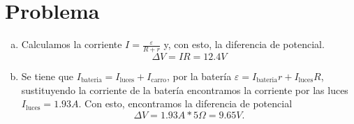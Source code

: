 \section*{Problema}

\begin{enumerate}[a)]
	\item Calculamos la corriente $I = \frac{\varepsilon}{R + r}$ y, con esto, la diferencia de potencial.
		$$ \boxed{ \Delta V = IR = 12.4V } $$
	\item Se tiene que $I_{\text{bateria}} = I_{\text{luces}} + I_{\text{carro}}$, por la batería $\varepsilon = I_{\text{bateria}} r + I_{\text{luces}} R$, sustituyendo la corriente de la batería encontramos la corriente por las luces $I_{\text{luces}} = 1.93A$. Con esto, encontramos la diferencia de potencial
		$$ \boxed{\Delta V = 1.93A*5\Omega = 9.65V .} $$
\end{enumerate}









